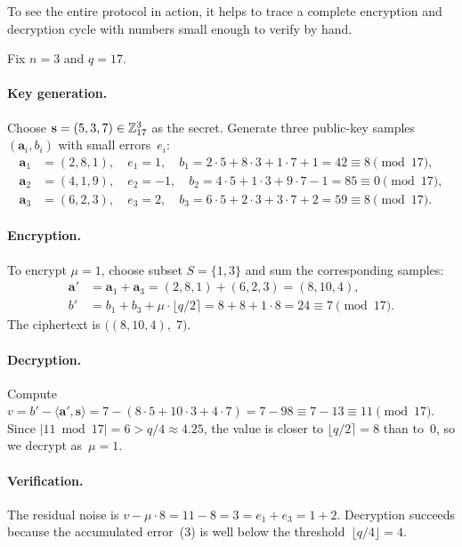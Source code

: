 To see the entire protocol in action, it helps to trace a complete encryption and decryption cycle with numbers small enough to verify by hand.

\begin{example}[Complete LWE Encryption ($n=3$, $q=17$)]
\label{ex:lwe-concrete}
Fix $n=3$ and $q=17$.

\paragraph{Key generation.}
Choose $\mathbf{s}=(5,3,7)\in\mathbb{Z}_{17}^3$ as the secret.  Generate three public-key samples $(\mathbf{a}_i, b_i)$ with small errors~$e_i$:
\begin{align*}
\mathbf{a}_1 &= (2,8,1),\quad e_1 = 1,\quad b_1 = 2{\cdot}5 + 8{\cdot}3 + 1{\cdot}7 + 1 = 42 \equiv 8 \pmod{17}, \\
\mathbf{a}_2 &= (4,1,9),\quad e_2 = -1,\quad b_2 = 4{\cdot}5 + 1{\cdot}3 + 9{\cdot}7 - 1 = 85 \equiv 0 \pmod{17}, \\
\mathbf{a}_3 &= (6,2,3),\quad e_3 = 2,\quad b_3 = 6{\cdot}5 + 2{\cdot}3 + 3{\cdot}7 + 2 = 59 \equiv 8 \pmod{17}.
\end{align*}

\paragraph{Encryption.}
To encrypt $\mu = 1$, choose subset $S = \{1,3\}$ and sum the corresponding samples:
\begin{align*}
\mathbf{a}' &= \mathbf{a}_1 + \mathbf{a}_3 = (2,8,1)+(6,2,3) = (8,10,4), \\
b' &= b_1 + b_3 + \mu\cdot\lfloor q/2\rceil = 8+8+1\cdot 8 = 24 \equiv 7 \pmod{17}.
\end{align*}
The ciphertext is $\bigl((8,10,4),\;7\bigr)$.

\paragraph{Decryption.}
Compute $v = b' - \langle\mathbf{a}',\mathbf{s}\rangle = 7 - (8{\cdot}5+10{\cdot}3+4{\cdot}7) = 7-98 \equiv 7-13 \equiv 11 \pmod{17}$.  Since $|11 \bmod{17}| = 6 > q/4 \approx 4.25$, the value is closer to $\lfloor q/2\rceil = 8$ than to~$0$, so we decrypt as~$\mu=1$.

\paragraph{Verification.}
The residual noise is $v - \mu\cdot 8 = 11 - 8 = 3 = e_1+e_3 = 1+2$.  Decryption succeeds because the accumulated error~($3$) is well below the threshold~$\lfloor q/4\rfloor = 4$.
\end{example}


